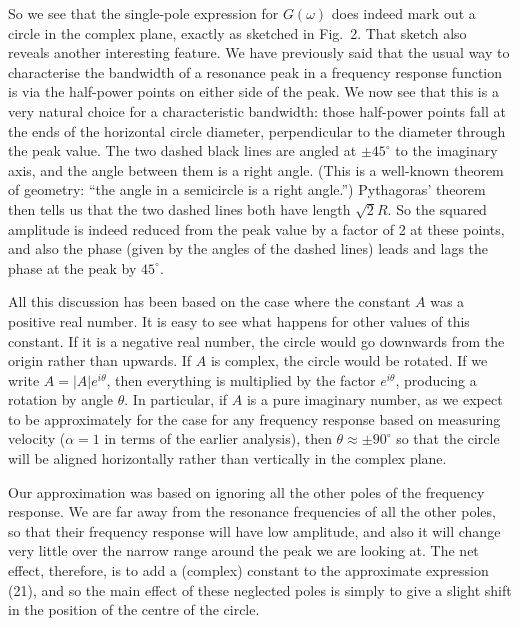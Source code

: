   So we see that the single-pole expression for $G(\omega)$ does indeed mark 
  out a circle in the complex plane, exactly as sketched in Fig.\ 2. That 
  sketch also reveals another interesting feature. We have previously said that 
  the usual way to characterise the bandwidth of a resonance peak in a 
  frequency response function is via the half-power points on either side of 
  the peak. We now see that this is a very natural choice for a characteristic 
  bandwidth: those half-power points fall at the ends of the horizontal circle 
  diameter, perpendicular to the diameter through the peak value. The two 
  dashed black lines are angled at $\pm45^\circ$ to the imaginary axis, and the 
  angle between them is a right angle. (This is a well-known theorem of 
  geometry: ``the angle in a semicircle is a right angle.'') Pythagoras' 
  theorem then tells us that the two dashed lines both have length $\sqrt{2}R$. 
  So the squared amplitude is indeed reduced from the peak value by a factor of 
  2 at these points, and also the phase (given by the angles of the dashed 
  lines) leads and lags the phase at the peak by $45^\circ$. 

  All this discussion has been based on the case where the constant $A$ was a 
  positive real number. It is easy to see what happens for other values of this 
  constant. If it is a negative real number, the circle would go downwards from 
  the origin rather than upwards. If $A$ is complex, the circle would be 
  rotated. If we write $A=|A| e^{i \theta}$, then everything is multiplied by 
  the factor $e^{i \theta}$, producing a rotation by angle $\theta$. In 
  particular, if $A$ is a pure imaginary number, as we expect to be 
  approximately for the case for any frequency response based on measuring 
  velocity ($\alpha = 1$ in terms of the earlier analysis), then $\theta 
  \approx \pm 90^\circ$ so that the circle will be aligned horizontally rather 
  than vertically in the complex plane. 

  Our approximation was based on ignoring all the other poles of the frequency 
  response. We are far away from the resonance frequencies of all the other 
  poles, so that their frequency response will have low amplitude, and also it 
  will change very little over the narrow range around the peak we are looking 
  at. The net effect, therefore, is to add a (complex) constant to the 
  approximate expression (21), and so the main effect of these neglected poles 
  is simply to give a slight shift in the position of the centre of the circle. 

